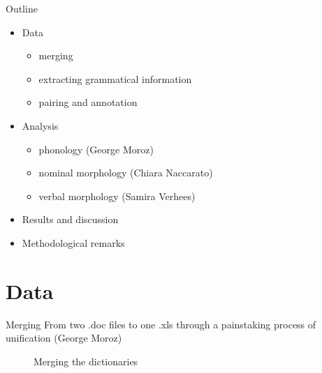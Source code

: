 \begin{frame}{Outline}
\begin{itemize}
    \item Data 
    \begin{itemize}
        \item merging
        \item extracting grammatical information
        \item pairing and annotation
    \end{itemize}
    \item Analysis
    \begin{itemize}
        \item phonology (George Moroz)
        \item nominal morphology (Chiara Naccarato)
        \item verbal morphology (Samira Verhees)
    \end{itemize}
    \item Results and discussion
    \item Methodological remarks 
\end{itemize}
\end{frame}

\section{Data}
\begin{frame}{Merging}
From two .doc files to one .xls through a painstaking process of unification (George Moroz)
\begin{figure}[h]
\centering
{}
\caption{Merging the dictionaries}
\end{figure}
\end{frame}

